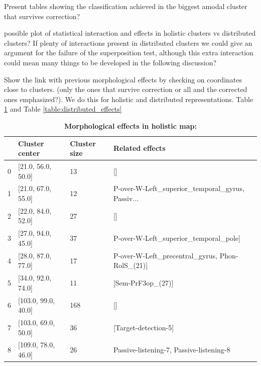 Present tables showing the classification achieved in the biggest amodal cluster that survives correction?

possible plot of statistical interaction and effects in holistic clusters vs distributed clusters? If plenty of interactions present in distributed clusters we could give an argument for the failure of the superposition test, although this extra interaction could mean many things to be developed in the following discussion?

Show the link with previous morphological effects by checking on coordinates close to clusters. (only the ones that survive correction or all and the corrected ones emphasized?). We do this for holistic and distributed representations. Table \ref{table:holistic_effects} and Table \ref{table:distributed_effects}


\begin{table}
\begin{tabular}{llll}
\toprule
{} &       Cluster center & Cluster size &                                    Related effects \\
\midrule
0 &   [21.0, 56.0, 50.0] &           13 &                                                 [] \\
1 &   [21.0, 67.0, 55.0] &           12 &  P-over-W-Left\_superior\_temporal\_gyrus, Passiv... \\
2 &   [22.0, 84.0, 52.0] &           27 &                                                 [] \\
3 &   [27.0, 94.0, 45.0] &           37 &             P-over-W-Left\_superior\_temporal\_pole] \\
4 &   [28.0, 87.0, 77.0] &           17 &   P-over-W-Left\_precentral\_gyrus, Phon-RolS\_(21)] \\
5 &   [34.0, 92.0, 74.0] &           11 &                                  [Sem-PrF3op\_(27)] \\
6 &  [103.0, 99.0, 40.0] &          168 &                                                 [] \\
7 &  [103.0, 69.0, 50.0] &           36 &                               [Target-detection-5] \\
8 &  [109.0, 78.0, 46.0] &           26 &         Passive-listening-7, Passive-listening-8 \\
\bottomrule
\end{tabular}
\caption{\textbf{Morphological effects in holistic map:}}
\label{table:holistic_effects}
\end{table}


